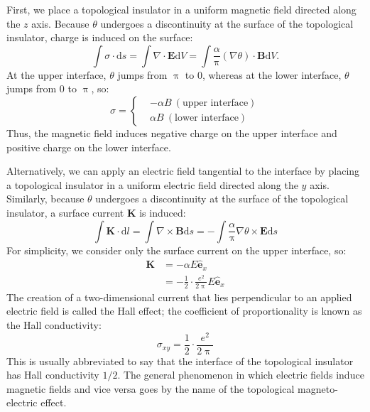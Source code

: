 First, we place a topological insulator in a uniform magnetic field directed along the $z$ axis. Because $\theta$ undergoes a discontinuity at the surface of the topological insulator, charge is induced on the surface:
\begin{equation}
\int \sigma \cdot \mathrm{d}s = \int \nabla \cdot \bm{E} \mathrm{d}V = \int \frac{\alpha}{\uppi} (\nabla \theta) \cdot \bm{B} \mathrm{d}V.
\end{equation}
At the upper interface, $\theta$ jumps from $\uppi$ to $0$, whereas at the lower interface, $\theta$ jumps from $0$ to $\uppi$, so:
\begin{equation}
\sigma = \left\{
\begin{aligned}
&-\alpha B \ (\text{upper interface}) \\
&\alpha B \ (\text{lower interface})
\end{aligned}
\right.
\end{equation}
Thus, the magnetic field induces negative charge on the upper interface and positive charge on the lower interface.

Alternatively, we can apply an electric field tangential to the interface by placing a topological insulator in a uniform electric field directed along the $y$ axis. Similarly, because $\theta$ undergoes a discontinuity at the surface of the topological insulator, a surface current $\bm{K}$ is induced:
\begin{equation}
\int \bm{K} \cdot \mathrm{d}l = \int \nabla \times \bm{B} \mathrm{d}s = -\int \frac{\alpha}{\uppi} \nabla \theta \times \bm{E} \mathrm{d}s
\end{equation}
For simplicity, we consider only the surface current on the upper interface, so:
\begin{equation}
\begin{aligned}
\bm{K} &= -\alpha E \hat{\bm{e}}_x \\
&= -\frac{1}{2} \cdot \frac{e^2}{2\uppi} E \hat{\bm{e}}_x
\end{aligned}
\end{equation}
The creation of a two-dimensional current that lies perpendicular to an applied electric field is called the Hall effect; the coefficient of proportionality is known as the Hall conductivity:
\begin{equation}
\sigma_{xy} = \frac{1}{2} \cdot \frac{e^2}{2\uppi}
\end{equation}
This is usually abbreviated to say that the interface of the topological insulator has Hall conductivity $1/2$.
The general phenomenon in which electric fields induce magnetic fields and vice versa goes by the name of the topological magneto-electric effect.
